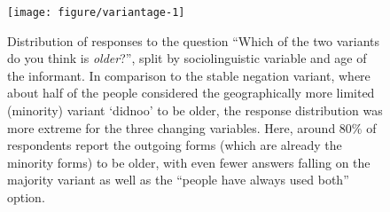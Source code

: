 
\begin{figure}[htbp]

{\centering \texttt{[image: figure/variantage-1]} 

}

\caption[Distribution of responses to the question ``Which of the two variants do you think is \emph{older}?'', split by sociolinguistic variable and age of the informant]{Distribution of responses to the question ``Which of the two variants do you think is \emph{older}?'', split by sociolinguistic variable and age of the informant. In comparison to the stable negation variant, where about half of the people considered the geographically more limited (minority) variant `didnoo' to be older, the response distribution was more extreme for the three changing variables. Here, around 80\% of respondents report the outgoing forms (which are already the minority forms) to be older, with even fewer answers falling on the majority variant as well as the ``people have always used both'' option.}\label{fig:variantage}
\end{figure}


